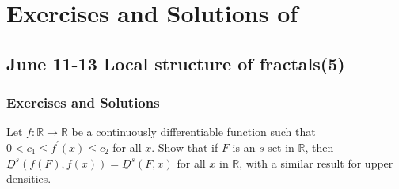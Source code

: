\section{Exercises and Solutions of \texorpdfstring{\cite{gf}}{Lg}}

\subsection{June 11-13 Local structure of fractals(5)}
\subsubsection{Exercises and Solutions}
\begin{customexercise}{5.2}
    Let $f: \mathbb{R} \rightarrow \mathbb{R}$ be a continuously differentiable function such that $0<c_{1} \leq f^{\prime}(x) \leq c_{2}$ for all $x .$ Show that if $F$ is an $s$-set in $\mathbb{R}$, then $\underline{D}^{s}(f(F), f(x))=\underline{D}^{s}(F, x)$ for all $x$ in $\mathbb{R}$, with a similar result for upper densities.    
\end{customexercise}

